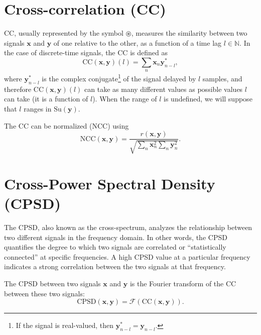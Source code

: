\section{Cross-correlation (CC)}
\label{sec:cross-correlation}

\gls{CC}, usually represented by the symbol $\circledast$, measures
the similarity between two signals $\mathbf{x}$ and $\mathbf{y}$ of
one relative to the other, as a function of a time lag
$l\in\mathbb{N}$. In the case of discrete-time signals, the \gls{CC}
is defined as
\begin{equation}
  {\text{CC}(\mathbf{x},\mathbf{y})}(l)=\sum_n{\mathbf{x}}_n \mathbf{y}^*_{n-l},
\end{equation}
where $\mathbf{y}^* _{n-l}$ is the complex conjugate\footnote{If the
  signal is real-valued, then $\mathbf{y}^*_{n-l}=\mathbf{y}_{n-l}$.}
of the signal delayed by $l$ samples, and therefore
${\text{CC}(\mathbf{x},\mathbf{y})}(l)$ can take as many different
values as possible values $l$ can take (it is a function of $l$).
When the range of $l$ is undefined, we will suppose that $l$ ranges in
$\text{Su}(\mathbf{\mathbf{y}})$.

The \gls{CC} can be normalized (\gls{NCC}) using
\begin{equation}
  \text{NCC}(\mathbf{x},\mathbf{y})=\frac{{r(\mathbf{x},\mathbf{y})}}{\sqrt{\sum_n \mathbf{x}_n^2 \sum_n \mathbf{y}_n^2}}.
\end{equation}


\section{Cross-Power Spectral Density (CPSD)}
\label{sec:CPSD}

The \gls{CPSD}, also known as the cross-spectrum, analyzes the
relationship between two different signals in the frequency domain. In
other words, the \gls{CPSD} quantifies the degree to which two signals
are correlated or ``statistically connected'' at specific
frequencies. A high \gls{CPSD} value at a particular frequency indicates a
strong correlation between the two signals at that frequency.

The \gls{CPSD} between two signals $\mathbf{x}$ and $\mathbf{y}$ is
the Fourier transform of the \gls{CC} between these two
signals:
\begin{equation}
  \text{CPSD}(\mathbf{x},\mathbf{y})=\mathcal{F}({\text{CC}(\mathbf{x},\mathbf{y})}).
\end{equation}

